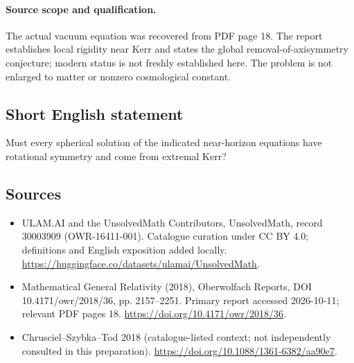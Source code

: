 \documentclass[11pt]{article}
\begin{document}
\paragraph{Source scope and qualification.}
The actual vacuum equation was recovered from PDF page 18. The report establishes local rigidity near Kerr and states the global removal-of-axisymmetry conjecture; modern status is not freshly established here. The problem is not enlarged to matter or nonzero cosmological constant.
\subsection{Short English statement}
Must every spherical solution of the indicated near-horizon equations have rotational symmetry and come from extremal Kerr?
\subsection{Sources}
\begin{itemize}
\item[\hypertarget{source:30003909:1}{S1}] ULAM.AI and the UnsolvedMath Contributors, UnsolvedMath, record 30003909 (OWR-16411-001). Catalogue curation under CC BY 4.0; definitions and English exposition added locally.
\url{https://huggingface.co/datasets/ulamai/UnsolvedMath}.
\item[\hypertarget{source:30003909:2}{S2}] Mathematical General Relativity (2018), Oberwolfach Reports, DOI 10.4171/owr/2018/36, pp. 2157--2251. Primary report accessed 2026-10-11; relevant PDF pages 18.
\url{https://doi.org/10.4171/owr/2018/36}.
\item[\hypertarget{source:30003909:3}{S3}] Chrusciel--Szybka--Tod 2018 (catalogue-listed context; not independently consulted in this preparation).
\url{https://doi.org/10.1088/1361-6382/aa90e7}.
\end{itemize}
\label{end:30003909}
\end{document}
